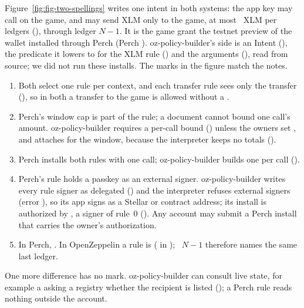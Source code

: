 Figure~\ref{fig:fig-two-spellings} writes one intent in both systems: the app key
may call  on the game, and may send XLM only to the game, at most
~XLM per  ledgers
(), through ledger $N-1$. It is the game grant the
testnet preview of the  wallet installed through Perch
(Perch ). oz-policy-builder's side is an Intent
(), the predicate it lowers to
for the XLM rule () and the 
arguments (), read from source; we did not run these
installs. The marks in the figure match the notes.


\begin{enumerate}[label=\protect\callout{\arabic*},leftmargin=*,itemsep=1pt]
\item Both select one rule per context, and each transfer rule sees only the
transfer (), so in both a transfer to
the game is allowed without a .
\item Perch's window cap is part of the rule; a document cannot bound one call's
amount. oz-policy-builder requires a per-call bound () unless the owners
set , and attaches  for the
window, because the interpreter keeps no totals ().
\item Perch installs both rules with one  call;
oz-policy-builder builds one  per 
call ().
\item Perch's rule holds a passkey as an external signer. oz-policy-builder writes
every rule signer as delegated () and the interpreter refuses
external signers (error ), so its app signs as a
Stellar or contract address; its install is authorized by , a
signer of rule~0 (). Any account may submit a Perch install
that carries the owner's authorization.
\item In Perch, . In OpenZeppelin a rule is
 ( in
); ~$N-1$ therefore names the same
last ledger.
\end{enumerate}

\noindent One more difference has no mark. oz-policy-builder can consult live
state, for example a  asking a registry whether the recipient is listed
(); a Perch rule reads nothing outside the account.
